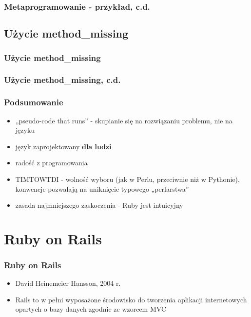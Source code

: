 \documentclass[12t]{beamer}
\begin{document}
\begin{frame}[fragile]
  \frametitle{Metaprogramowanie - przykład, c.d.}
  
\end{frame}

\subsection{Użycie method\_missing}
\begin{frame}[fragile]
  \frametitle{Użycie method\_missing}
  
\end{frame}

\begin{frame}[fragile]
  \frametitle{Użycie method\_missing, c.d.}
  
\end{frame}

\begin{frame}
  \frametitle{Podsumowanie}
  \begin{itemize}
  \item „pseudo-code that runs” - skupianie się na rozwiązaniu
    problemu, nie na języku
  \item język zaprojektowany \textbf{dla ludzi}
  \item radość z programowania
  \item TIMTOWTDI - wolność wyboru (jak w Perlu, przeciwnie niż w
    Pythonie), konwencje pozwalają na uniknięcie typowego „perlarstwa”
  \item zasada najmniejszego zaskoczenia - Ruby jest intuicyjny
  \end{itemize}
\end{frame}

\section{Ruby on Rails}
\begin{frame}
  \frametitle{Ruby on Rails}
  \begin{itemize}
  \item David Heinemeier Hansson, 2004 r.
  \item Rails to w pełni wyposażone środowisko do tworzenia aplikacji internetowych opartych o bazy danych zgodnie ze wzorcem MVC
  \end{itemize}
\end{frame}
\end{document}
